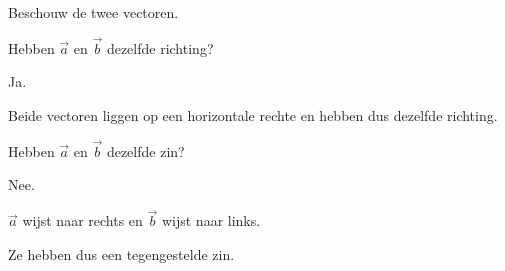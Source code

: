 \documentclass{ximera}
\begin{document}
\begin{oefening}{\oefB\ESS}

Beschouw de twee vectoren.

\begin{center}
\end{center}


\begin{question}
Hebben $\vec{a}$ en $\vec{b}$ dezelfde richting?

\begin{oplossing}
Ja.

Beide vectoren liggen op een horizontale rechte en hebben dus dezelfde
richting.
\end{oplossing}
\end{question}


\begin{question}
Hebben $\vec{a}$ en $\vec{b}$ dezelfde zin?

\begin{oplossing}
Nee.

$\vec{a}$ wijst naar rechts en $\vec{b}$ wijst naar links.

Ze hebben dus een tegengestelde zin.
\end{oplossing}
\end{question}

\end{oefening}
\end{document}
